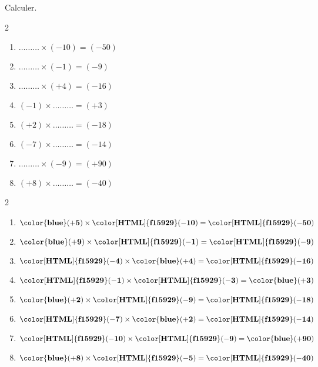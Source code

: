 \begin{exercice*}
    Calculer.
    \begin{multicols}2
        \begin{enumerate}
            \item $ \ldots\ldots\ldots \times (-10) = (-50) $
            \item $ \ldots\ldots\ldots \times (-1) = (-9) $
            \item $ \ldots\ldots\ldots \times (+4) = (-16) $
            \item $ (-1) \times \ldots\ldots\ldots = (+3) $
            \item $ (+2) \times \ldots\ldots\ldots = (-18) $
            \item $ (-7) \times \ldots\ldots\ldots = (-14) $
            \item $ \ldots\ldots\ldots \times (-9) = (+90) $
            \item $ (+8) \times \ldots\ldots\ldots = (-40) $
        \end{enumerate}
    \end{multicols}

\end{exercice*}
\begin{corrige}
    \phantom{rrr}    
    \begin{multicols}2
        \begin{enumerate}
            \item $ \mathbf{{\color{blue}(+5)}} \times \mathbf{{\color[HTML]{f15929}(-10)}} = \mathbf{{\color[HTML]{f15929}(-50)}} $
            \item $ \mathbf{{\color{blue}(+9)}} \times \mathbf{{\color[HTML]{f15929}(-1)}} = \mathbf{{\color[HTML]{f15929}(-9)}} $
            \item $ \mathbf{{\color[HTML]{f15929}(-4)}} \times \mathbf{{\color{blue}(+4)}} = \mathbf{{\color[HTML]{f15929}(-16)}} $
            \item $ \mathbf{{\color[HTML]{f15929}(-1)}} \times \mathbf{{\color[HTML]{f15929}(-3)}} = \mathbf{{\color{blue}(+3)}} $
            \item $ \mathbf{{\color{blue}(+2)}} \times \mathbf{{\color[HTML]{f15929}(-9)}} = \mathbf{{\color[HTML]{f15929}(-18)}} $
            \item $ \mathbf{{\color[HTML]{f15929}(-7)}} \times \mathbf{{\color{blue}(+2)}} = \mathbf{{\color[HTML]{f15929}(-14)}} $
            \item $ \mathbf{{\color[HTML]{f15929}(-10)}} \times \mathbf{{\color[HTML]{f15929}(-9)}} = \mathbf{{\color{blue}(+90)}} $
            \item $ \mathbf{{\color{blue}(+8)}} \times \mathbf{{\color[HTML]{f15929}(-5)}} = \mathbf{{\color[HTML]{f15929}(-40)}} $      
        \end{enumerate}
    \end{multicols}
\end{corrige}